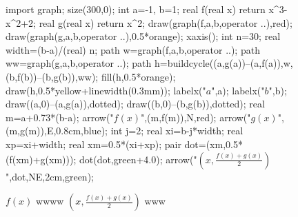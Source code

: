 \documentclass[a4paper]{report}
\begin{document}
												\begin{figure}[!ht]
													\centering
													\begin{asy}
														import graph;
														size(300,0);
														int a=-1, b=1;
														real f(real x) {return x^3-x^2+2;}
														real g(real x) {return x^2;}
														draw(graph(f,a,b,operator ..),red);
														draw(graph(g,a,b,operator ..),0.5*orange);
														xaxis();
														int n=30;
														real width=(b-a)/(real) n;
														path w=graph(f,a,b,operator ..);
														path ww=graph(g,a,b,operator ..);
														path h=buildcycle((a,g(a))--(a,f(a)),w,(b,f(b))--(b,g(b)),ww);
														fill(h,0.5*orange);
														draw(h,0.5*yellow+linewidth(0.3mm));
														labelx("$a$",a);
														labelx("$b$",b);
														draw((a,0)--(a,g(a)),dotted);
														draw((b,0)--(b,g(b)),dotted);
														real m=a+0.73*(b-a);
														arrow("$f(x)$",(m,f(m)),N,red);
														arrow("$g(x)$",(m,g(m)),E,0.8cm,blue);
														int j=2;
														real xi=b-j*width;
														real xp=xi+width;
														real xm=0.5*(xi+xp);
														pair dot=(xm,0.5*(f(xm)+g(xm)));
														dot(dot,green+4.0);
														arrow("$\left(x,\frac{f(x)+g(x)}{2}\right)$",dot,NE,2cm,green);
													\end{asy}
													\caption{$f(x)$ wwww $\left(x,\frac{f(x)+g(x)}{2}\right)$ www}
												\end{figure}
\end{document}
